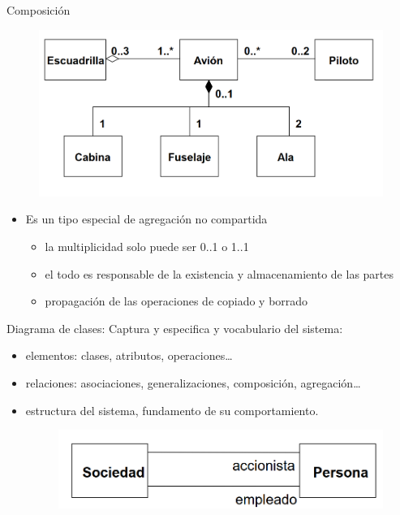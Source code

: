 \documentclass[12pt, twoside, openright]{report} %
\begin{document}
	Composición
	\begin{figure}[H]
		{\includegraphics[scale=.2]{Untitled 27.png}}
	\end{figure}
    \begin{itemize}
    
    \item
      Es un tipo especial de agregación no compartida

      \begin{itemize}
      
      \item
        la multiplicidad solo puede ser 0..1 o 1..1
      \item
        el todo es responsable de la existencia y almacenamiento de las
        partes
      \item
        propagación de las operaciones de copiado y borrado
      \end{itemize}
    \end{itemize}

	Diagrama de clases: Captura y especifica y vocabulario del sistema:

    \begin{itemize}
    
    \item
      elementos: clases, atributos, operaciones\ldots{}
    \item
      relaciones: asociaciones, generalizaciones, composición,
      agregación\ldots{}
    \item
      estructura del sistema, fundamento de su comportamiento.
	  \begin{figure}[H]
		{\includegraphics[scale=.25]{Untitled 28.png}}
	\end{figure}
    \end{itemize}
\end{document}
